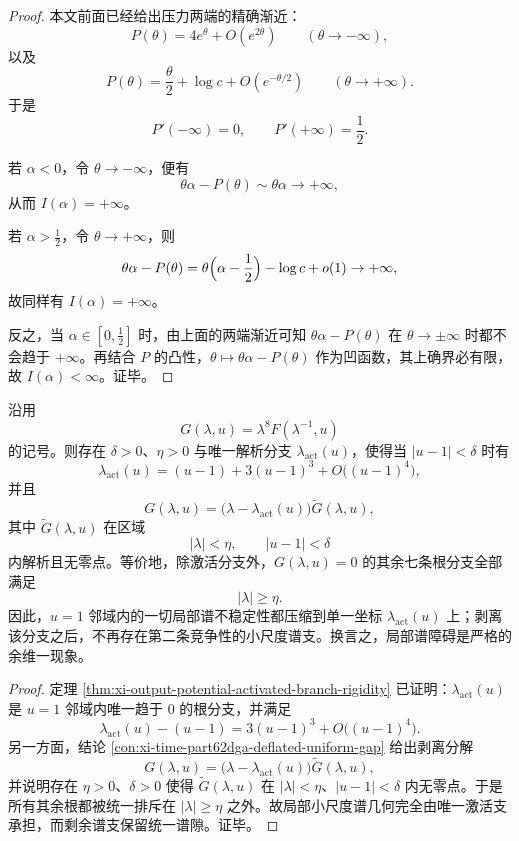 \begin{proof}
本文前面已经给出压力两端的精确渐近：
\[
P(\theta)=4e^\theta+O(e^{2\theta})
\qquad (\theta\to-\infty),
\]
以及
\[
P(\theta)=\frac{\theta}{2}+\log c+O(e^{-\theta/2})
\qquad (\theta\to+\infty).
\]
于是
\[
P'(-\infty)=0,
\qquad
P'(+\infty)=\frac12.
\]

若 \(\alpha<0\)，令 \(\theta\to-\infty\)，便有
\[
\theta\alpha-P(\theta)\sim \theta\alpha\to+\infty,
\]
从而 \(I(\alpha)=+\infty\)。

若 \(\alpha>\tfrac12\)，令 \(\theta\to+\infty\)，则
\[
\theta\alpha-P(\theta)
=
\theta\Bigl(\alpha-\frac12\Bigr)-\log c+o(1)\to+\infty,
\]
故同样有 \(I(\alpha)=+\infty\)。

反之，当 \(\alpha\in[0,\tfrac12]\) 时，由上面的两端渐近可知 \(\theta\alpha-P(\theta)\) 在 \(\theta\to\pm\infty\) 时都不会趋于 \(+\infty\)。再结合 \(P\) 的凸性，\(\theta\mapsto \theta\alpha-P(\theta)\) 作为凹函数，其上确界必有限，故 \(I(\alpha)<\infty\)。证毕。
\end{proof}

\begin{theorem}[\texorpdfstring{$u=1$}{u=1} 邻域局部谱障碍的余维一性]\label{thm:conclusion-realinput40-u1-codimone-activated-obstruction}
沿用
\[
G(\lambda,u)=\lambda^8F(\lambda^{-1},u)
\]
的记号。则存在 \(\delta>0\)、\(\eta>0\) 与唯一解析分支 \(\lambda_{\mathrm{act}}(u)\)，使得当 \(|u-1|<\delta\) 时有
\[
\lambda_{\mathrm{act}}(u)
=(u-1)+3(u-1)^3+O\!\bigl((u-1)^4\bigr),
\]
并且
\[
G(\lambda,u)
=
\bigl(\lambda-\lambda_{\mathrm{act}}(u)\bigr)\widetilde G(\lambda,u),
\]
其中 \(\widetilde G(\lambda,u)\) 在区域
\[
|\lambda|<\eta,\qquad |u-1|<\delta
\]
内解析且无零点。等价地，除激活分支外，\(G(\lambda,u)=0\) 的其余七条根分支全部满足
\[
|\lambda|\ge \eta.
\]
因此，\(u=1\) 邻域内的一切局部谱不稳定性都压缩到单一坐标 \(\lambda_{\mathrm{act}}(u)\) 上；剥离该分支之后，不再存在第二条竞争性的小尺度谱支。换言之，局部谱障碍是严格的余维一现象。
\end{theorem}
\begin{proof}
定理 \ref{thm:xi-output-potential-activated-branch-rigidity} 已证明：\(\lambda_{\mathrm{act}}(u)\) 是 \(u=1\) 邻域内唯一趋于 \(0\) 的根分支，并满足
\[
\lambda_{\mathrm{act}}(u)-(u-1)=3(u-1)^3+O\!\bigl((u-1)^4\bigr).
\]
另一方面，结论 \ref{con:xi-time-part62dga-deflated-uniform-gap} 给出剥离分解
\[
G(\lambda,u)
=
\bigl(\lambda-\lambda_{\mathrm{act}}(u)\bigr)\widetilde G(\lambda,u),
\]
并说明存在 \(\eta>0\)、\(\delta>0\) 使得 \(\widetilde G(\lambda,u)\) 在 \(|\lambda|<\eta\)、\(|u-1|<\delta\) 内无零点。于是所有其余根都被统一排斥在 \(|\lambda|\ge \eta\) 之外。故局部小尺度谱几何完全由唯一激活支承担，而剩余谱支保留统一谱隙。证毕。
\end{proof}

